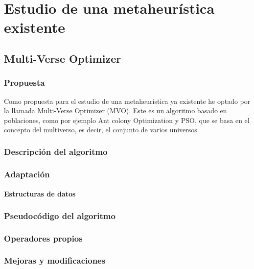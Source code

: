 \chapter{Estudio de una metaheurística existente}
\section{Multi-Verse Optimizer}
\subsection{Propuesta}
Como propuesta para el estudio de una metaheurística ya existente he optado por la llamada Multi-Verse Optimizer (MVO).
Este es un algoritmo basado en poblaciones, como por ejemplo Ant colony Optimization y PSO, que se basa en el concepto del multiverso, es decir, el conjunto de varios universos.

\subsection{Descripción del algoritmo}

\subsection{Adaptación}

\subsubsection{Estructuras de datos}


\subsection{Pseudocódigo del algoritmo}
%

\subsection{Operadores propios}
%

\subsection{Mejoras y modificaciones}
